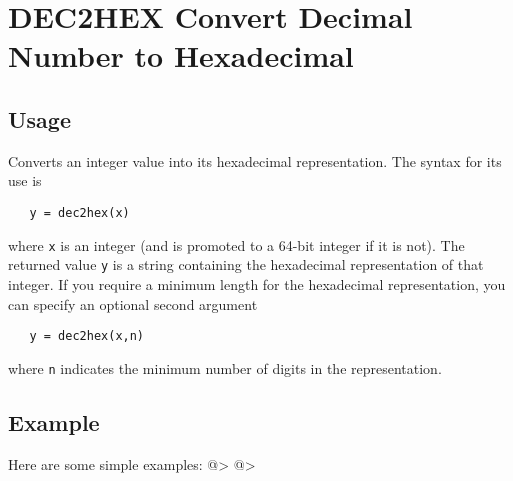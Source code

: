 \section{DEC2HEX Convert Decimal Number to Hexadecimal}

\subsection{Usage}

Converts an integer value into its hexadecimal representation.  The syntax
for its use is
\begin{verbatim}
   y = dec2hex(x)
\end{verbatim}
where \verb|x| is an integer (and is promoted to a 64-bit integer if it is not).
The returned value \verb|y| is a string containing the hexadecimal representation
of that integer.  If you require a minimum length for the hexadecimal
representation, you can specify an optional second argument
\begin{verbatim}
   y = dec2hex(x,n)
\end{verbatim}
where \verb|n| indicates the minimum number of digits in the representation.
\subsection{Example}

Here are some simple examples:
@>
@>
